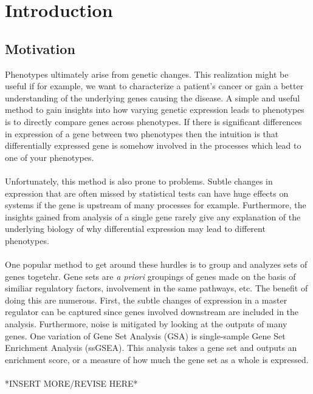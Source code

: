 \documentclass[a4paper,12pt]{article}
\begin{document}
\begin{comment}
\title{Problem 1}
\author{Andrew Luo (luoa)}
\maketitle
\end{comment}
\section{Introduction}
\subsection{Motivation}
Phenotypes ultimately arise from genetic changes. This realization might be useful if for example, we want to characterize a patient's cancer or gain a better understanding of the underlying genes causing the disease. A simple and useful method to gain insights into how varying genetic expression leads to phenotypes is to directly compare genes across phenotypes. If there is significant differences in expression of a gene between two phenotypes then the intuition is that differentially expressed gene is somehow involved in the processes which lead to one of your phenotypes. 
\\ \\
Unfortunately, this method is also prone to problems. Subtle changes in expression that are often missed by statistical tests can have huge effects on systems if the gene is upstream of many processes for example. Furthermore, the insights gained from analysis of a single gene rarely give any explanation of the underlying biology of why differential expression may lead to different phenotypes.
\\ \\
One popular method to get around these hurdles is to group and analyzes sets of genes togetehr. Gene sets are \textit{a priori} groupings of genes made on the basis of similiar regulatory factors, involvement in the same pathways, etc. The benefit of doing this are numerous. First, the subtle changes of expression in a master regulator can be captured since genes involved downstream are included in the analysis. Furthermore, noise is mitigated by looking at the outputs of many genes. One variation of Gene Set Analysis (GSA) is single-sample Gene Set Enrichment Analysis (ssGSEA). This analysis takes a gene set and outputs an enrichment score, or a measure of how much the gene set as a whole is expressed.
\\ \\
*INSERT MORE/REVISE HERE*
\end{document}
